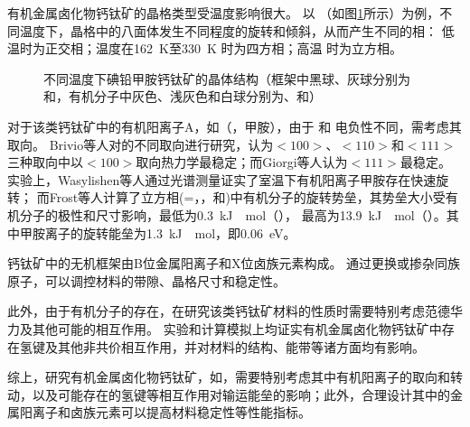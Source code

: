 有机金属卤化物钙钛矿的晶格类型受温度影响很大。
以 （如图\ref{fig:temp-struc}所示）为例，不同温度下，晶格中的八面体发生不同程度的旋转和倾斜，从而产生不同的相：
低温时为正交相；温度在\SI{162}{K}至\SI{330}{K} 时为四方相；高温 时为立方相。

\begin{figure}[htbp]
    \centering
    \caption{不同温度下碘铅甲胺钙钛矿的晶体结构（框架中黑球、灰球分别为和，有机分子中灰色、浅灰色和白球分别为、和）}
    \label{fig:temp-struc}
\end{figure}

对于该类钙钛矿中的有机阳离子A，如（，甲胺），由于 和 电负性不同，需考虑其取向。
Brivio等人对的不同取向进行研究，认为$<100>$、$<110>$和$<111>$三种取向中以$<100>$取向热力学最稳定；而Giorgi等人认为$<111>$最稳定。
实验上，Wasylishen等人通过光谱测量证实了室温下有机阳离子甲胺存在快速旋转；
而Frost等人计算了立方相(=，，和)中有机分子的旋转势垒，其势垒大小受有机分子的极性和尺寸影响，最低为\SI{0.3}{kJ \per \mole}（）， 最高为\SI{13.9}{kJ \per \mole}（）。其中甲胺离子的旋转能垒为\SI{1.3}{kJ \per \mole}，即\SI{0.06}{eV}。

钙钛矿中的无机框架由B位金属阳离子和X位卤族元素构成。
通过更换或掺杂同族原子，可以调控材料的带隙、晶格尺寸和稳定性。

此外，由于有机分子的存在，在研究该类钙钛矿材料的性质时需要特别考虑范德华力及其他可能的相互作用。
实验和计算模拟上均证实有机金属卤化物钙钛矿中存在氢键及其他非共价相互作用，并对材料的结构、能带等诸方面均有影响。

综上，研究有机金属卤化物钙钛矿，如，需要特别考虑其中有机阳离子的取向和转动，以及可能存在的氢键等相互作用对输运能垒的影响；此外，合理设计其中的金属阳离子和卤族元素可以提高材料稳定性等性能指标。

